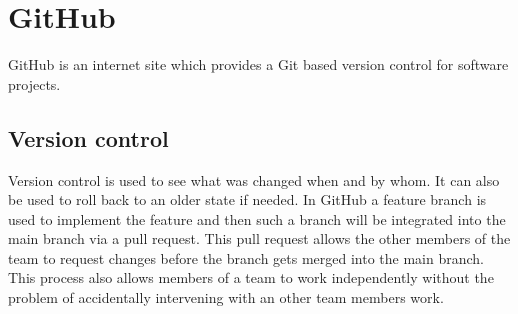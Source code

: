 \section{GitHub} \label{GitHub}
GitHub \cite{github_url} is an internet site which provides a Git based version control for software projects.
\subsection{Version control}
Version control is used to see what was changed when and by whom. It can also be used to roll back to an older state if needed. In GitHub a feature branch is used to implement the feature and then such a branch will be integrated into the main branch via a pull request. This pull request allows the other members of the team to request changes before the branch gets merged into the main branch. This process also allows members of a team to work independently without the problem of accidentally intervening with an other team members work.